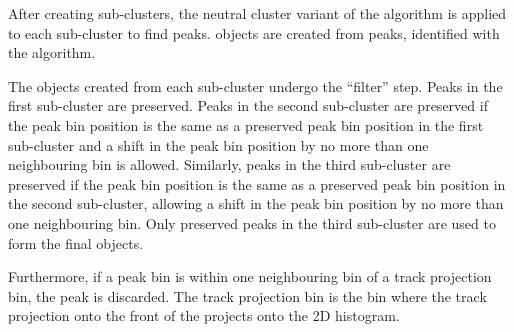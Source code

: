 After creating sub-clusters, the neutral cluster variant of the  \peakFinding algorithm is applied to each sub-cluster to find peaks. \ShowerPeak objects are created from peaks, identified with the  \peakFinding algorithm.


The \ShowerPeak objects created from each sub-cluster undergo the ``\ShowerPeak filter'' step. Peaks in the first sub-cluster are preserved. Peaks in the second sub-cluster are preserved if the peak bin position is the same as a preserved peak bin position in the first sub-cluster and a shift in the peak bin position by no more than one neighbouring bin is allowed. Similarly, peaks in the third sub-cluster are preserved if the peak bin position is the same as a preserved peak bin position in the second sub-cluster, allowing a shift in the peak bin position by no more than one neighbouring bin. Only preserved peaks in the third sub-cluster are used to form the final \ShowerPeak objects.

Furthermore, if a peak bin is within one neighbouring bin of a track projection bin, the peak is discarded. The track projection bin  is the bin where the track projection onto the front of the \ECAL projects onto the 2D histogram.







